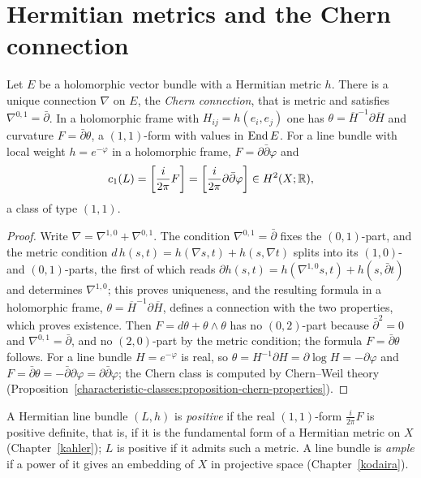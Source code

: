 \section{Hermitian metrics and the Chern connection}\label{holomorphic-bundles:section-chern-connection}

\begin{theorem}\label{holomorphic-bundles:theorem-chern-connection}
Let $E$ be a holomorphic vector bundle with a Hermitian metric $h$. There is a unique connection $\nabla$ on $E$, the \emph{Chern connection}, that is metric and satisfies $\nabla^{0,1} = \bar\partial$. In a
holomorphic frame with $H_{ij} = h(e_i, e_j)$ one has $\theta = \overline{H}^{-1}\partial\overline{H}$ and curvature $F = \bar\partial\theta$, a $(1,1)$-form with values in $\operatorname{End} E$. For a line bundle with local
weight $h = e^{-\varphi}$ in a holomorphic frame, $F = \partial\bar\partial\varphi$ and
\[
c_1(L) = \left[\frac{i}{2\pi}F\right] = \left[\frac{i}{2\pi}\partial\bar\partial\varphi\right] \in H^2(X; \mathbb{R}),
\]
a class of type $(1,1)$.
\end{theorem}

\begin{proof}
Write $\nabla = \nabla^{1,0} + \nabla^{0,1}$. The condition $\nabla^{0,1} = \bar\partial$ fixes the $(0,1)$-part, and the metric condition
$d\,h(s, t) = h(\nabla s, t) + h(s, \nabla t)$ splits into its $(1,0)$- and $(0,1)$-parts, the first of which reads $\partial h(s, t) = h(\nabla^{1,0}s, t) + h(s, \bar\partial t)$ and determines $\nabla^{1,0}$; this
proves uniqueness, and the resulting formula in a holomorphic frame, $\theta = \overline{H}^{-1}\partial\overline{H}$, defines a connection with the two properties, which proves existence. Then
$F = d\theta + \theta \wedge \theta$ has no $(0,2)$-part because $\bar\partial^2 = 0$ and $\nabla^{0,1} = \bar\partial$, and no $(2,0)$-part by the metric condition; the formula $F = \bar\partial\theta$ follows. For a
line bundle $H = e^{-\varphi}$ is real, so $\theta = H^{-1}\partial H = \partial\log H = -\partial\varphi$ and $F = \bar\partial\theta = -\bar\partial\partial\varphi = \partial\bar\partial\varphi$; the Chern class is
computed by Chern--Weil theory (Proposition~\ref{characteristic-classes:proposition-chern-properties}).
\end{proof}

\begin{definition}\label{holomorphic-bundles:definition-positive}
A Hermitian line bundle $(L, h)$ is \emph{positive} if the real $(1,1)$-form $\frac{i}{2\pi}F$ is positive definite, that is, if it is the fundamental form of a Hermitian metric on $X$
(Chapter~\ref{kahler}); $L$ is positive if it admits such a metric. A line bundle is \emph{ample} if a power of it gives an embedding of $X$ in projective space
(Chapter~\ref{kodaira}).
\end{definition}

